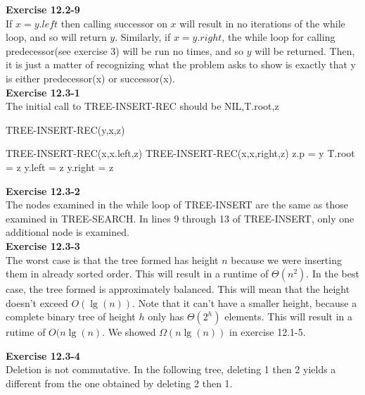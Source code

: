 \documentclass{article}
\begin{document}
\noindent\textbf{ Exercise 12.2-9} \\

If $x = y.left$ then calling successor on $x$ will result in no iterations of the while loop, and so will return $y$. Similarly, if $x =y.right$, the while loop for calling predecessor(see exercise 3) will be run no times, and so $y$ will be returned. Then, it is just a matter of recognizing what the problem asks to show is exactly that y  is either predecessor(x) or successor(x).\\

\noindent\textbf{ Exercise 12.3-1} \\

The initial call to TREE-INSERT-REC should be NIL,T.root,z
\begin{algorithm}
\caption{TREE-INSERT-REC(y,x,z)}
\begin{algorithmic}
\State TREE-INSERT-REC(x,x.left,z)
\Else
\State TREE-INSERT-REC(x,x,right,z)
\EndIf
\EndIf
\State z.p = y
\State T.root = z
\State y.left = z
\Else
\State y.right = z
\EndIf
\end{algorithmic}
\end{algorithm}

\noindent\textbf{Exercise 12.3-2}\\

The nodes examined in the while loop of TREE-INSERT are the same as those examined in TREE-SEARCH.  In lines 9 through 13 of TREE-INSERT, only one additional node is examined. \\

\noindent\textbf{ Exercise 12.3-3} \\

The worst case is that the tree formed has height $n$ because we were inserting them in already sorted order. This will result in a runtime of $\Theta(n^2)$. In the best case, the tree formed is approximately balanced. This will mean that the height doesn't exceed $O(\lg(n))$. Note that it can't have a smaller height, because a complete binary tree of height $h$ only has $\Theta(2^h)$ elements. This will result in a rutime of $O(n\lg(n)$. We showed $\Omega(n\lg(n))$ in exercise 12.1-5.

\noindent\textbf{Exercise 12.3-4}\\

Deletion is not commutative.  In the following tree, deleting 1 then 2 yields a different from the one obtained by deleting 2 then 1.
\end{document}
